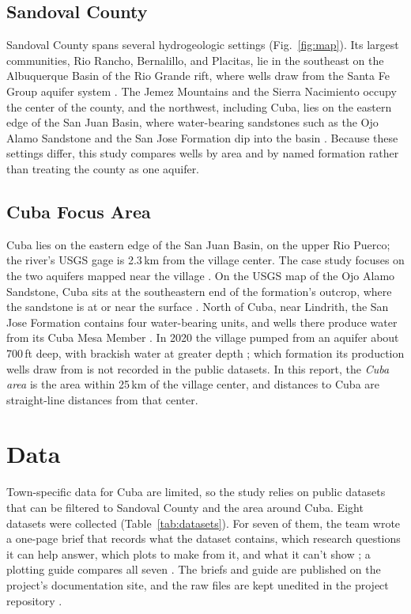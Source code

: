 \documentclass[10pt,twocolumn,letterpaper]{article}
\begin{document}
\subsection{Sandoval County}
Sandoval County spans several hydrogeologic settings (Fig.~\ref{fig:map}). Its largest
communities, Rio Rancho, Bernalillo, and Placitas, lie in the southeast on the Albuquerque Basin of
the Rio Grande rift, where wells draw from the Santa Fe Group aquifer system \citep{ritchie2019}. The
Jemez Mountains and the Sierra Nacimiento occupy the center of the county, and the northwest,
including Cuba, lies on the eastern edge of the San Juan Basin, where water-bearing sandstones such
as the Ojo Alamo Sandstone and the San Jose Formation dip into the basin
\citep{renick1931,kernodle1996,thorn1990}. Because these settings differ, this study compares wells
by area and by named formation rather than treating the county as one aquifer.

\subsection{Cuba Focus Area}
Cuba lies on the eastern edge of the San Juan Basin, on the upper Rio Puerco; the river's USGS gage
is 2.3\,km from the village center. The case study focuses on the two aquifers
mapped near the village \citep{usgs_rasa_sjb,kernodle1996}. On the USGS map of the Ojo Alamo
Sandstone, Cuba sits at the southeastern end of the formation's outcrop, where the sandstone is at or
near the surface \citep{thorn1990}. North of Cuba, near Lindrith, the San Jose
Formation contains four water-bearing units, and wells there produce water from its Cuba Mesa Member
\citep{blandford2025}. In 2020 the village pumped
from an aquifer about 700\,ft deep, with brackish water at greater depth \citep{davis2020}; which
formation its production wells draw from is not recorded in the public datasets. In this report,
the \emph{Cuba area} is the area within 25\,km of the village center, and distances to Cuba are
straight-line distances from that center.

\section{Data}\label{sec:data}
Town-specific data for Cuba are limited, so the study relies on public datasets that can be
filtered to Sandoval County and the area around Cuba. Eight datasets were collected
(Table~\ref{tab:datasets}). For seven of them, the team wrote a one-page brief that records what
the dataset contains, which research questions it can help answer, which plots to make from it,
and what it can't show \citep{gonzales_brief1,gonzales_brief2,gonzales_brief3,gonzales_brief4,gonzales_brief5,gonzales_brief6,gonzales_brief7};
a plotting guide compares all seven \citep{gonzales_guide}. The briefs and guide are published on
the project's documentation site, and the raw files are kept unedited in the project repository
\citep{team23_repo}.
\end{document}
